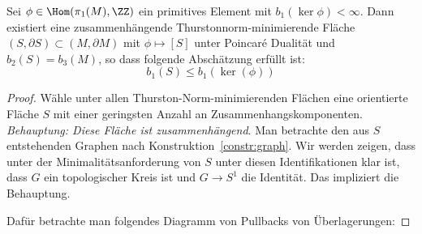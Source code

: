 \begin{lem}
	\label{lem:minS}
	Sei $\phi \in \Hom (\pi_1(M),\ZZ)$ ein primitives Element mit $b_1(\ker\phi)<\infty$. Dann existiert eine zusammenhängende Thurstonnorm-minimierende Fläche $(S,\partial S) \subset (M,\partial M)$ mit $\phi \mapsto [S]$ unter Poincaré Dualität und $b_2(S)=b_3(M)$, so dass folgende Abschätzung erfüllt ist:
	\[
	b_1(S) \leq b_1(\ker(\phi))
	\]
\end{lem}
\begin{proof}
	Wähle unter allen Thurston-Norm-minimierenden Flächen eine orientierte Fläche $S$ mit einer geringsten Anzahl an Zusammenhangskomponenten.\\
	\textit{Behauptung: Diese Fläche ist zusammenhängend}.
	Man betrachte den aus $S$ entstehenden Graphen nach Konstruktion~\ref{constr:graph}.
	Wir werden zeigen, dass unter der Minimalitätsanforderung von $S$ unter diesen Identifikationen klar ist, dass $G$ ein topologischer Kreis ist und $G\to S^1$ die Identität. Das impliziert die Behauptung.

	Dafür betrachte man folgendes Diagramm von Pullbacks von Überlagerungen:


\end{proof}
